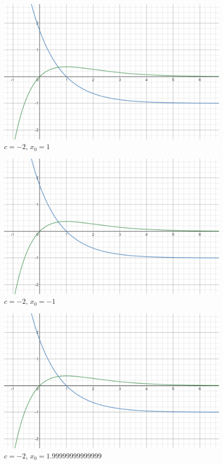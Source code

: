 \documentclass[]{article}
\begin{document}
\begin{figure}[!htbp]
	\includegraphics[scale=1]{e1-x-1andxe-x.png}
	\centering
	\caption{$c = -2$, $x_0 = 1$}
\end{figure}
\clearpage
\begin{figure}[!htbp]
	\includegraphics[scale=1]{e1-x-1andxe-x.png}
	\centering
	\caption{$c = -2$, $x_0 = -1$}
\end{figure}
\begin{figure}[!htbp]
	\includegraphics[scale=1]{e1-x-1andxe-x.png}
	\centering
	\caption{$c = -2$, $x_0 = 1.99999999999999$}
\end{figure}
\end{document}
